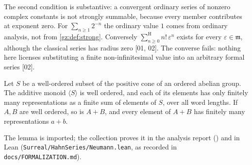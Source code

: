 \documentclass[11pt,a4paper]{article}
\numberwithin{equation}{section}
\theoremstyle{definition}
\theoremstyle{remark}
\newcommand{\mm}{\mathfrak m}
\newcommand{\eps}{\varepsilon}
\newcommand{\Sh}{\mathop{\textstyle\sum}\nolimits^{\mathrm H}}
\newcommand{\src}[1]{\textup{[#1]}}
\begin{document}
The second condition is substantive: a convergent ordinary series of
nonzero complex constants is not strongly summable, because every member
contributes at exponent zero. For $\sum_{n\ge1}2^{-n}$ the ordinary value
$1$ comes from ordinary analysis, not from \cref{gz:def:strong}. Conversely
$\Sh_{n\ge0}n!\,\eps^n$ exists for every $\eps\in\mm$, although the
classical series has radius zero \src{01, 02}. The converse fails: nothing
here licenses substituting a finite non-infinitesimal value into an
arbitrary formal series \src{02}.

\begin{lemma}\label{gz:lem:neumann}
Let $S$ be a well-ordered subset of the positive cone of an ordered abelian
group. The additive monoid $\langle S\rangle$ is well ordered, and each of
its elements has only finitely many representations as a finite sum of
elements of $S$, over all word lengths. If $A,B$ are well ordered, so is
$A+B$, and every element of $A+B$ has finitely many representations
$a+b$.
\end{lemma}
The lemma is imported; the collection proves it in the analysis report
() and in Lean (\texttt{Surreal/HahnSeries/Neumann.lean},
as recorded in \texttt{docs/FORMALIZATION.md}).
\end{document}
